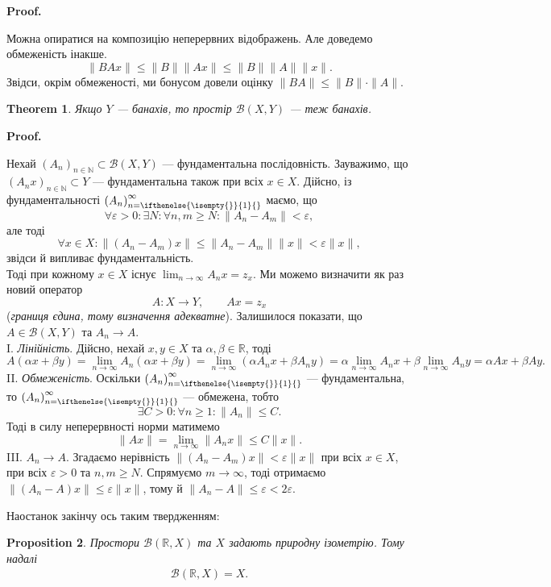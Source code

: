 \documentclass[a4paper, 10pt]{article}
\makeatletter
\theoremstyle{theoremdd}
\newtheorem{theorem}{Theorem}[subsection]
\theoremstyle{theoremdd}
\theoremstyle{theoremdd}
\theoremstyle{theoremdd}
\theoremstyle{theoremdd}
\newtheorem{proposition}[theorem]{Proposition}
\theoremstyle{theoremdd}
\theoremstyle{theoremdd}
\theoremstyle{theoremdd}
\newcommand{\sequence}[2][]{\left({#2}\right)_{n=\ifthenelse{\isempty{#1}}{1}{#1}}^{\infty}}
\renewenvironment{proof}[1][Proof.\\]{\par
\pushQED{\hfill \qed}%
\normalfont \topsep6\p@\@plus6\p@\relax
\trivlist
\item\relax
{\bfseries
#1\@addpunct{.}}\hspace\labelsep\ignorespaces
}{%
\popQED\endtrivlist\@endpefalse
}
\makeatother
\begin{document}
\begin{proof}
Можна опиратися на композицію неперервних відображень. Але доведемо обмеженість інакше.
\[
\|BA x\| \leq \|B\| \|Ax\| \leq \|B\| \|A\| \|x\|.
\]
Звідси, окрім обмеженості, ми бонусом довели оцінку $\|BA\| \leq \|B\| \cdot \|A\|$.
\end{proof}

\begin{theorem}
Якщо $Y$ --- банахів, то простір $\mathcal{B}(X,Y)$ --- теж банахів.
\end{theorem}

\begin{proof}
Нехай $(A_n)_{n \in \mathbb{N}} \subset \mathcal{B}(X,Y)$ --- фундаментальна послідовність. Зауважимо, що $(A_n x)_{n \in \mathbb{N}} \subset Y$ --- фундаментальна також при всіх $x \in X$. Дійсно, із фундаментальності $\sequence{A_n}$ маємо, що 
\[
\forall \varepsilon > 0: \exists N: \forall n,m \geq N: \|A_n-A_m\| < \varepsilon,
\]
але тоді
\[
\forall x \in X: \|(A_n-A_m)x\| \leq \|A_n-A_m\| \|x\| < \varepsilon \|x\|,
\] звідси й випливає фундаментальність.\\
Тоді при кожному $x \in X$ існує $\displaystyle\lim_{n \to \infty} A_n x = z_x$. Ми можемо визначити як раз новий оператор 
\[
A \colon X \to Y, \qquad Ax = z_x
\]
(\textit{границя єдина, тому визначення адекватне}). Залишилося показати, що $A \in \mathcal{B}(X,Y)$ та $A_n \to A$.\\
I. \textit{Лінійність}. \quad Дійсно, нехай $x,y \in X$ та $\alpha,\beta \in \mathbb{R}$, тоді
\[
A(\alpha x + \beta y) = \displaystyle\lim_{n \to \infty} A_n(\alpha x + \beta y) = \lim_{n \to \infty} (\alpha A_nx + \beta A_n y) = \alpha \lim_{n \to \infty} A_n x + \beta \lim_{n \to \infty} A_n y = \alpha Ax + \beta Ay.
\]
II. \textit{Обмеженість}. \quad Оскільки $\sequence{A_n}$ --- фундаментальна, то $\sequence{A_n}$ --- обмежена, тобто 
\[
\exists C > 0: \forall n \geq 1: \|A_n\| \leq C.
\]
Тоді в силу неперервності норми матимемо
\[
\|Ax\| = \lim_{n \to \infty} \|A_nx\| \leq C \|x\|.
\]
III. \textit{$A_n \to A$}. \quad Згадаємо нерівність $\|(A_n-A_m)x\| < \varepsilon \|x\|$ при всіх $x \in X$, при всіх $\varepsilon > 0$ та $n,m \geq N$. Спрямуємо $m \to \infty$, тоді отримаємо $\|(A_n-A)x\| \leq \varepsilon \|x\|$, тому й $\|A_n-A\| \leq \varepsilon < 2\varepsilon$.
\end{proof}

Наостанок закінчу ось таким твердженням:
\begin{proposition}
\label{isometry_between_bounded_maps_and_normed_space}
Простори $\mathcal{B}(\mathbb{R},X)$ та $X$ задають природну ізометрію. Тому надалі
\begin{align*}
\mathcal{B}(\mathbb{R},X) = X.
\end{align*}
\end{proposition}
\end{document}
